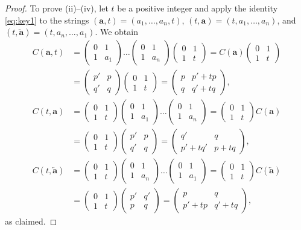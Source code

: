 \documentclass[10pt]{article}
\theoremstyle{definition}
\numberwithin{equation}{section}
\numberwithin{lemma}{section}
\newcommand{\bfa}{\mathbf{a}}
\newcommand{\bfar}{\overleftarrow{\bfa}}
\newcommand{\mat}[1]{\begin{pmatrix} 0 & 1\\ 1 & #1\end{pmatrix}}
\begin{document}
\begin{proof}
To prove (ii)--(iv), let $t$ be a positive integer and apply the
identity \eqref{eq:key1} to the strings $(\bfa,t)=(a_1,\dots,a_n,t)$,
$(t,\bfa)=(t,a_1,\dots,a_n)$, and $(t,\bfar)=(t,a_n,\dots,a_1)$.
We obtain 
\begin{align*}
C(\bfa,t)
&=\mat{a_1}\dots\mat{a_n}\mat{t}  
=C(\bfa) 
\begin{pmatrix} 0&1\\1&t\end{pmatrix}
\\
&=\begin{pmatrix} p'&p\\q'&q\end{pmatrix}
\begin{pmatrix} 0&1\\1&t\end{pmatrix}
=
\begin{pmatrix} p & p'+tp\\ q&q'+tq \end{pmatrix},
\\[1ex]
C(t,\bfa)
&=\mat{t}\mat{a_1}\dots\mat{a_n}
= \begin{pmatrix} 0&1\\1&t\end{pmatrix}
C(\bfa)
\\
&=
\begin{pmatrix} 0&1\\1&t\end{pmatrix}
\begin{pmatrix} p'&p\\q'&q\end{pmatrix}
=
\begin{pmatrix} q' & q \\ p'+tq'& p+tq \end{pmatrix},
\\[1ex]
C(t,\bfar)
&=\mat{t}\mat{a_n}\dots\mat{a_1}
= \begin{pmatrix} 0&1\\1&t\end{pmatrix} C(\bfar)
\\
&=
\begin{pmatrix} 0&1\\1&t\end{pmatrix}
\begin{pmatrix} p'&q'\\p&q\end{pmatrix}
=
\begin{pmatrix} p & q \\ p'+tp& q'+tq \end{pmatrix},
\end{align*}
as claimed.
\end{proof}
\end{document}
